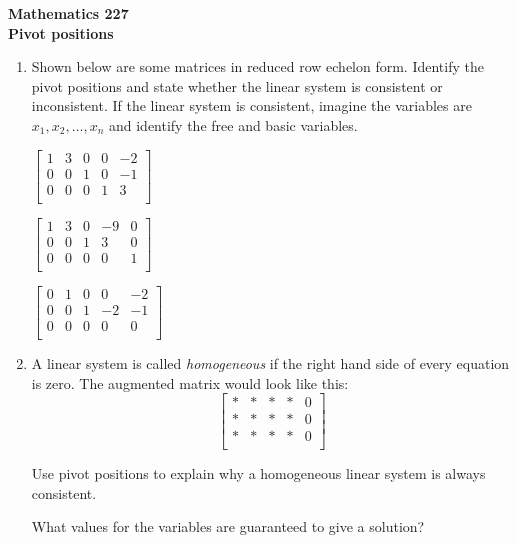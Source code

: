 \documentclass[12pt]{article}
\newcommand{\vs}[1]{\vspace{#1in}}
\begin{document}
\noindent
{\bf Mathematics 227} \\ 
{\bf Pivot positions}

\bigskip
\begin{enumerate}
\item Shown below are some matrices in reduced row echelon form.
  Identify the pivot positions and state whether the linear system is
  consistent or inconsistent.  If the linear system is consistent,
  imagine the variables are $x_1, x_2,\ldots, x_n$ and identify the
  free and basic variables.

  \bigskip
  $
  \left[
    \begin{array}{cccc|c}
      1 & 3 & 0 & 0 & -2 \\
      0 & 0 & 1 & 0 & -1 \\
      0 & 0 & 0 & 1 & 3 \\
    \end{array}
  \right]
  $

  \bigskip
  $
  \left[
    \begin{array}{cccc|c}
      1 & 3 & 0 & -9 & 0 \\
      0 & 0 & 1 & 3 & 0 \\
      0 & 0 & 0 & 0 & 1 \\
    \end{array}
  \right]
  $

  \bigskip
  $
  \left[
    \begin{array}{cccc|c}
      0 & 1 & 0 & 0 & -2 \\
      0 & 0 & 1 & -2 & -1 \\
      0 & 0 & 0 & 0 & 0 \\
    \end{array}
  \right]
  $

  \bigskip
\item A linear system is called {\em homogeneous} if the right hand
  side of every equation is zero.  The augmented matrix would look
  like this:
  $$
  \left[
    \begin{array}{cccc|c}
      * & * & * & * & 0 \\
      * & * & * & * & 0 \\
      * & * & * & * & 0 \\
    \end{array}
  \right]
  $$

  Use pivot positions to explain why a homogeneous linear system is
  always consistent.

  \vs{1}
  What values for the variables are guaranteed to give a solution?


\end{enumerate}
\end{document}
